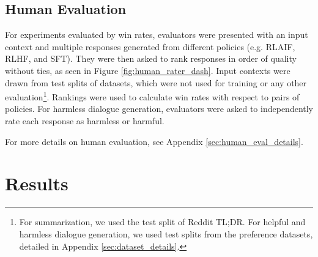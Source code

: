 \documentclass[11pt]{article}
\begin{document}
\subsection{Human Evaluation}
For experiments evaluated by win rates, evaluators were presented with an input context and multiple responses generated from different policies (e.g. RLAIF, RLHF, and SFT). They were then asked to rank responses in order of quality without ties, as seen in Figure \ref{fig:human_rater_dash}. Input contexts were drawn from test splits of datasets, which were not used for training or any other evaluation\footnote{For summarization, we used the test split of Reddit TL;DR. For helpful and harmless dialogue generation, we used test splits from the preference datasets, detailed in Appendix \ref{sec:dataset_details}.}. Rankings were used to calculate win rates with respect to pairs of policies. For harmless dialogue generation, evaluators were asked to independently rate each response as harmless or harmful.

For more details on human evaluation, see Appendix \ref{sec:human_eval_details}.




\section{Results}
\end{document}
